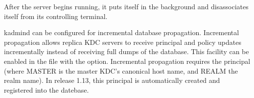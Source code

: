 \documentclass[letterpaper,10pt,english]{sphinxmanual}
\begin{document}
After the server begins running, it puts itself in the background and
disassociates itself from its controlling terminal.

kadmind can be configured for incremental database propagation.
Incremental propagation allows replica KDC servers to receive
principal and policy updates incrementally instead of receiving full
dumps of the database.  This facility can be enabled in the
{\hyperref[\detokenize{admin/conf_files/kdc_conf:kdc-conf-5}]{}} file with the  option.  Incremental
propagation requires the principal  (where
MASTER is the master KDC’s canonical host name, and REALM the realm
name).  In release 1.13, this principal is automatically created and
registered into the datebase.
\end{document}
